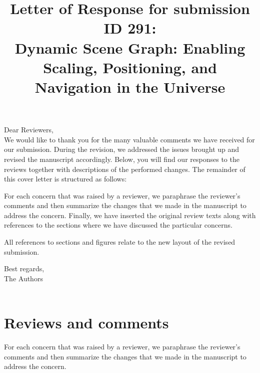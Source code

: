 \documentclass{article}
\date{}
\begin{document}
\title{Letter of Response for submission ID 291: \\Dynamic Scene Graph: Enabling Scaling, Positioning, and Navigation in the Universe}
\maketitle

Dear Reviewers, \\

We would like to thank you for the many valuable comments we have received for our submission.
During the revision, we addressed the issues brought up and revised the manuscript accordingly.
Below, you will find our responses to the reviews together with descriptions of the performed changes.
The remainder of this cover letter is structured as follows:

For each concern that was raised by a reviewer, we paraphrase the reviewer's comments and then summarize the changes that we made in the manuscript to address the concern. Finally, we have inserted the original review texts along with references to the sections where we have discussed the particular concerns.

All references to sections and figures relate to the new layout of the revised submission.


Best regards, \\
The Authors \\\\

\newpage

\section{Reviews and comments}
For each concern that was raised by a reviewer, we paraphrase the reviewer's comments and then summarize the changes that we made in the manuscript to address the concern.

\vspace*{1cm}
\end{document}
